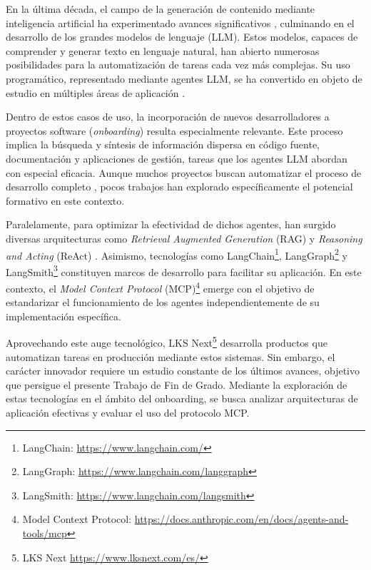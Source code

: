 En la última década, el campo de la generación de contenido mediante inteligencia artificial ha experimentado avances significativos \cite{vaswani_attention_2017}, culminando en el desarrollo de los grandes modelos de lenguaje (LLM). Estos modelos, capaces de comprender y generar texto en lenguaje natural, han abierto numerosas posibilidades para la automatización de tareas cada vez más complejas. Su uso programático, representado mediante agentes LLM, se ha convertido en objeto de estudio en múltiples áreas de aplicación \cite{xiaoliang_design_2024, dong_self-collaboration_2024}.

Dentro de estos casos de uso, la incorporación de nuevos desarrolladores a proyectos software (\textit{onboarding}) resulta especialmente relevante. Este proceso implica la búsqueda y síntesis de información dispersa en código fuente, documentación y aplicaciones de gestión, tareas que los agentes LLM abordan con especial eficacia. Aunque muchos proyectos buscan automatizar el proceso de desarrollo completo \cite{qian_chatdev_2024, acharya_devin_2025}, pocos trabajos han explorado específicamente el potencial formativo en este contexto.

Paralelamente, para optimizar la efectividad de dichos agentes, han surgido diversas arquitecturas como \textit{Retrieval Augmented Generation} (RAG) \cite{gao_retrieval-augmented_2024} y \textit{Reasoning and Acting} (ReAct) \cite{yao_react_2023}. Asimismo, tecnologías como LangChain\footnote{LangChain: \url{https://www.langchain.com/}}, LangGraph\footnote{LangGraph: \url{https://www.langchain.com/langgraph}} y LangSmith\footnote{LangSmith: \url{https://www.langchain.com/langsmith}} constituyen marcos de desarrollo para facilitar su aplicación. En este contexto, el \textit{Model Context Protocol} (MCP)\footnote{Model Context Protocol: \url{https://docs.anthropic.com/en/docs/agents-and-tools/mcp}} emerge con el objetivo de estandarizar el funcionamiento de los agentes independientemente de su implementación específica.


Aprovechando este auge tecnológico, LKS Next\footnote{LKS Next \url{https://www.lksnext.com/es/}} desarrolla productos que automatizan tareas en producción mediante estos sistemas. Sin embargo, el carácter innovador requiere un estudio constante de los últimos avances, objetivo que persigue el presente Trabajo de Fin de Grado. Mediante la exploración de estas tecnologías en el ámbito del onboarding, se busca analizar arquitecturas de aplicación efectivas y evaluar el uso del protocolo MCP.

